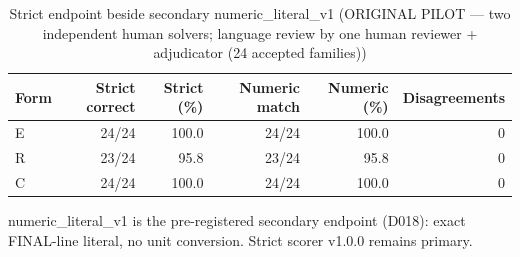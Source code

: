 \begin{table}[t]
\centering
\small
\caption{Strict endpoint beside secondary numeric\_literal\_v1 (ORIGINAL PILOT --- two independent human solvers; language review by one human reviewer + adjudicator (24 accepted families))}
\label{tab:pilotorig-Qwen3-8B-numeric}
\begin{tabular}{lrrrrr}
\toprule
Form & Strict correct & Strict (\%) & Numeric match & Numeric (\%) & Disagreements \\
\midrule
E & 24/24 & 100.0 & 24/24 & 100.0 & 0 \\
R & 23/24 & 95.8 & 23/24 & 95.8 & 0 \\
C & 24/24 & 100.0 & 24/24 & 100.0 & 0 \\
\bottomrule
\end{tabular}
\par\smallskip
\parbox{\linewidth}{\footnotesize numeric\_literal\_v1 is the pre-registered secondary endpoint (D018): exact FINAL-line literal, no unit conversion. Strict scorer v1.0.0 remains primary.}
\end{table}
